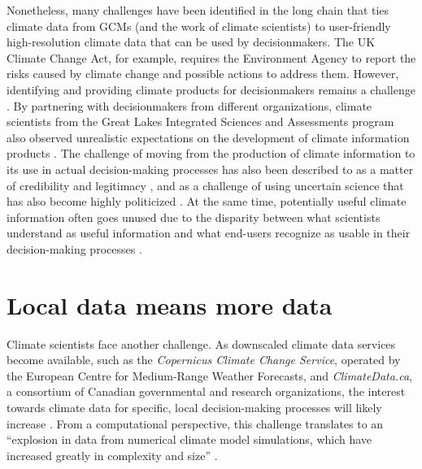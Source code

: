 \documentclass[
]{book}
\begin{document}
Nonetheless, many challenges have been identified in the long chain that ties climate data from GCMs (and the work of climate scientists) to user-friendly high-resolution climate data that can be used by decisionmakers. The UK Climate Change Act, for example, requires the Environment Agency to report the risks caused by climate change and possible actions to address them. However, identifying and providing climate products for decisionmakers remains a challenge \citep{Orr2021}. By partnering with decisionmakers from different organizations, climate scientists from the Great Lakes Integrated Sciences and Assessments program also observed unrealistic expectations on the development of climate information products \citep{Briley2015}. The challenge of moving from the production of climate information to its use in actual decision-making processes has also been described to as a matter of credibility and legitimacy \citep{Cash2006}, and as a challenge of using uncertain science that has also become highly politicized \citep{Meyer2011}. At the same time, potentially useful climate information often goes unused due to the disparity between what scientists understand as useful information and what end-users recognize as usable in their decision-making processes \citep{Lemos2012}.

\hypertarget{local-data-means-more-data}{%
\section{Local data means more data}\label{local-data-means-more-data}}

Climate scientists face another challenge. As downscaled climate data services become available, such as the \emph{Copernicus Climate Change Service}, operated by the European Centre for Medium-Range Weather Forecasts, and \emph{ClimateData.ca}, a consortium of Canadian governmental and research organizations, the interest towards climate data for specific, local decision-making processes will likely increase \citep{Morand2015, Buontempo2020}. From a computational perspective, this challenge translates to an ``explosion in data from numerical climate model simulations, which have increased greatly in complexity and size'' \citep{Overpeck2011}.
\end{document}
